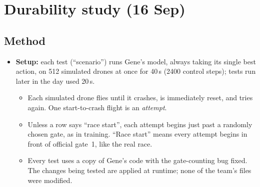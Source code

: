\documentclass[10pt,a4paper]{article}
\begin{document}
\section{Durability study (16 Sep)}\label{sec:stress}
\subsection{Method}
\begin{itemize}
\item \textbf{Setup:} each test (``scenario'') runs Gene's model, always taking its single best action, on 512 simulated drones at once for 40\,s (2400 control steps); tests run later in the day used 20\,s.
\begin{itemize}
\item Each simulated drone flies until it crashes, is immediately reset, and tries again. One start-to-crash flight is an \emph{attempt}.
\item Unless a row says ``race start'', each attempt begins just past a randomly chosen gate, as in training. ``Race start'' means every attempt begins in front of official gate~1, like the real race.
\item Every test uses a copy of Gene's code with the gate-counting bug fixed. The changes being tested are applied at runtime; none of the team's files were modified.
\end{itemize}
\end{itemize}
\end{document}

